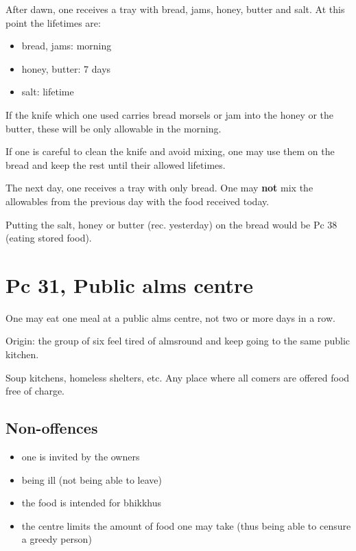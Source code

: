 After dawn, one receives a tray with bread, jams, honey, butter and
salt. At this point the lifetimes are:

\begin{itemize}
\tightlist
\item
  bread, jams: morning
\item
  honey, butter: 7 days
\item
  salt: lifetime
\end{itemize}

If the knife which one used carries bread morsels or jam into the honey
or the butter, these will be only allowable in the morning.

If one is careful to clean the knife and avoid mixing, one may use them
on the bread and keep the rest until their allowed lifetimes.

The next day, one receives a tray with only bread. One may \textbf{not}
mix the allowables from the previous day with the food received today.

Putting the salt, honey or butter (rec. yesterday) on the bread would be
Pc 38 (eating stored food).

\clearpage

\section{Pc 31, Public alms centre}

One may eat one meal at a public alms centre, not two or more days in a
row.

Origin: the group of six feel tired of almsround and keep going to the
same public kitchen.

Soup kitchens, homeless shelters, etc. Any place where all comers are
offered food free of charge.

\subsection{Non-offences}

\begin{itemize}
\tightlist
\item
  one is invited by the owners
\item
  being ill (not being able to leave)
\item
  the food is intended for bhikkhus
\item
  the centre limits the amount of food one may take (thus being able to
  censure a greedy person)
\end{itemize}

